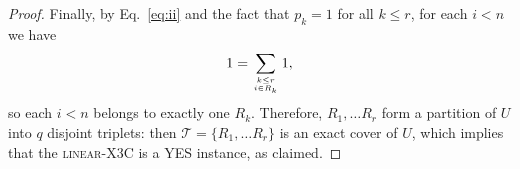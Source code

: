 \documentclass[10pt,a4paper]{amsart}
\begin{document}
\begin{proof}
Finally, by Eq.~\eqref{eq:ii} and the fact that $p_k=1$ for all $k\le r$, for each $i<n$ we have \[1=\sum_{k\le r\atop i\in R_k}1,\] so each $i<n$ belongs to exactly one $R_k$. Therefore, $R_1,\ldots R_r$ form a partition of $U$ into $q$ disjoint triplets: then $\mathcal{T}=\{R_1,\ldots R_r\}$ is an exact cover of $U$, which implies that the \textsc{linear}-X3C is a YES instance, as claimed.
\end{proof}
\end{document}
